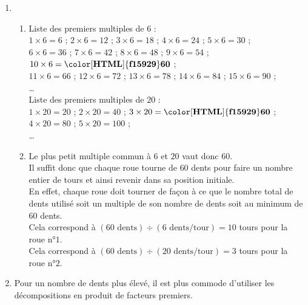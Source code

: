        \begin{enumerate}
            \item
            \begin{enumerate}
                \item Liste des premiers multiples de $6$ : \\
                $1\times6 = 6$ ; $2\times6 = 12$ ; $3\times6 = 18$ ; $4\times6 = 24$ ; $5\times6 = 30$ ; \\
                $6\times6 = 36$ ; $7\times6 = 42$ ; $8\times6 = 48$ ; $9\times6 = 54$ ; $10\times6 = \mathbf{{\color[HTML]{f15929}60}}$ ; \\
                $11\times6 = 66$ ; $12\times6 = 72$ ; $13\times6 = 78$ ; $14\times6 = 84$ ; $15\times6 = 90$ ; \\
                \dots \\
                Liste des premiers multiples de $20$ : \\
                $1\times20 = 20$ ; $2\times20 = 40$ ; $3\times20 = \mathbf{{\color[HTML]{f15929}60}}$ ; $4\times20 = 80$ ; $5\times20 = 100$ ; \\
                \dots \\
                \medskip
                \item Le plus petit multiple commun à $6$ et $20$ vaut donc $60$.\\
                Il suffit donc que chaque roue tourne de $60$ dents pour faire un nombre entier de tours et ainsi revenir dans sa position initiale.\\
                En effet, chaque roue doit tourner de façon à ce que le nombre total de dents utilisé soit un multiple de son nombre
                de dents soit au minimum de $60$ dents.\\
                 Cela correspond à $(60\text{ dents})\div (6\text{ dents/tour}) = 10$ tours pour la roue n°$1$.\\
                Cela correspond à $(60\text{ dents})\div (20\text{ dents/tour}) = 3$ tours pour la roue n°$2$.
            \end{enumerate}
            \item Pour un nombre de dents plus élevé, il est plus commode d'utiliser les décompositions en produit de facteurs premiers.\\
            \begin{enumerate}

\end{enumerate}
\end{enumerate}
